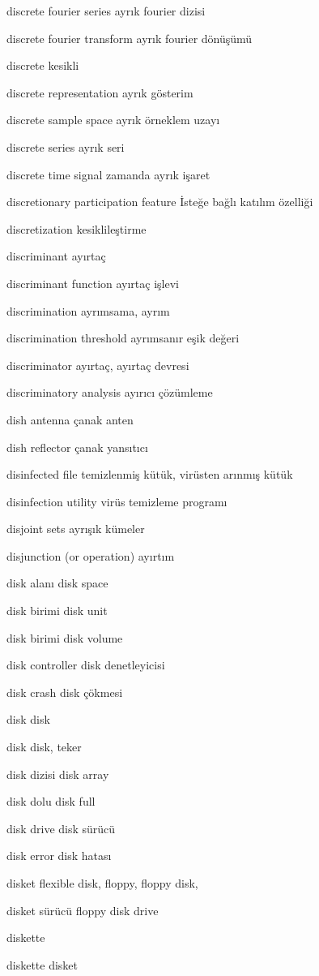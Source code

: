 \documentclass[12pt,fleqn]{article}\usepackage{../../common}
\begin{document}
discrete fourier series ayrık fourier dizisi

discrete fourier transform ayrık fourier dönüşümü

discrete kesikli

discrete representation ayrık gösterim

discrete sample space ayrık örneklem uzayı

discrete series ayrık seri

discrete time signal zamanda ayrık işaret

discretionary participation feature İsteğe bağlı katılım özelliği

discretization kesiklileştirme

discriminant ayırtaç

discriminant function ayırtaç işlevi

discrimination ayrımsama, ayrım

discrimination threshold ayrımsanır eşik değeri

discriminator ayırtaç, ayırtaç devresi

discriminatory analysis ayırıcı çözümleme

dish antenna çanak anten

dish reflector çanak yansıtıcı

disinfected file temizlenmiş kütük, virüsten arınmış kütük

disinfection utility virüs temizleme programı

disjoint sets ayrışık kümeler

disjunction (or operation) ayırtım

disk alanı disk space

disk birimi disk unit

disk birimi disk volume

disk controller disk denetleyicisi

disk crash disk çökmesi

disk disk

disk disk, teker

disk dizisi disk array

disk dolu disk full

disk drive disk sürücü

disk error disk hatası

disket flexible disk, floppy, floppy disk,

disket sürücü floppy disk drive

diskette

diskette disket
\end{document}

